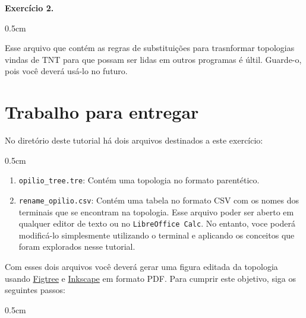\begin{refsection}
\begin{blackBlock}{\textbf{Exercício 2.}}
\begin {myindentpar}{0.5cm}
\begin{enumerate}[\itshape i.]
Esse arquivo que contém as regras de substituições para trasnformar topologias vindas de TNT para que possam ser lidas em outros programas é últil. Guarde-o, pois você deverá usá-lo no futuro.

\end{enumerate}
\end{myindentpar}

\end{blackBlock}


\section{Trabalho para entregar}\label{tut2:assigment}

No diretório deste tutorial há dois arquivos destinados a este exercício:\\

\begin {myindentpar}{0.5cm}
\begin{enumerate}[\itshape 1.]

 \item{\texttt{opilio\_tree.tre}:} Contém uma topologia no formato parentético.\\
 \item{\texttt{rename\_opilio.csv}:} Contém uma tabela no formato CSV com os nomes dos terminais que se encontram na topologia. Esse arquivo poder ser aberto em qualquer editor de texto ou no \texttt{LibreOffice Calc}. No entanto, voce poderá modificá-lo simplesmente utilizando o terminal e aplicando os conceitos que foram explorados nesse tutorial.\\

\end{enumerate}
\end{myindentpar}


Com esses dois arquivos você deverá gerar uma figura editada da topologia usando \href{http://tree.bio.ed.ac.uk/software/figtree/}{Figtree} e \href{https://inkscape.org/en/}{Inkscape} em formato PDF. Para cumprir este objetivo, siga os seguintes passos:

\begin {myindentpar}{0.5cm}
\begin{enumerate}[\itshape a.]


\end{enumerate}
\end{myindentpar}
\end{refsection}

